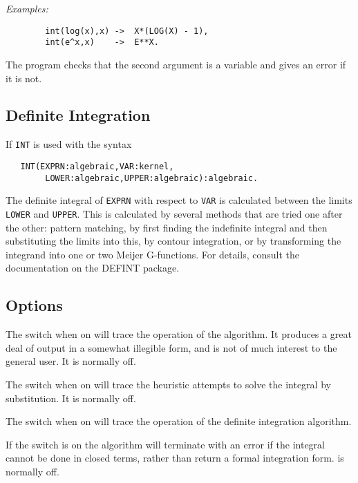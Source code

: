 \textit{Examples:}
\begin{verbatim}
        int(log(x),x) ->  X*(LOG(X) - 1),
        int(e^x,x)    ->  E**X.
\end{verbatim}
The program checks that the second argument is a variable and gives an
error if it is not.

\subsection{Definite Integration} 

If \texttt{INT} is used with the syntax

\begin{verbatim}
   INT(EXPRN:algebraic,VAR:kernel,
        LOWER:algebraic,UPPER:algebraic):algebraic.
\end{verbatim}

The definite integral of \texttt{EXPRN} with respect to \texttt{VAR} is
calculated between the limits \texttt{LOWER} and \texttt{UPPER}.
This is calculated by several methods that are tried one after the other:
pattern matching, by first finding
the indefinite integral and then substituting the limits into this, by contour integration, or
by transforming the integrand into one or two Meijer G-functions.
For details, consult
the documentation on the DEFINT package.


\subsection{Options}
\hypertarget{switch:TRINT}{}
\hypertarget{switch:TRINTSUBST}{}
\hypertarget{switch:TRDEFINT}{}
\hypertarget{switch:FAILHARD}{}
\hypertarget{switch:NOLNR}{}
\hypertarget{switch:NOINTSUBST}{}

The switch  when on will trace the operation of the algorithm. It
produces a great deal of output in a somewhat illegible form, and is not
of much interest to the general user. It is normally off.

The switch  when on will trace the heuristic attempts to
solve the integral by substitution. It is normally off.

The switch  when on will trace the operation of the definite integration algorithm.

If the switch  is on the algorithm will terminate with an
error if the integral cannot be done in closed terms, rather than return a
formal integration form.  is normally off.

